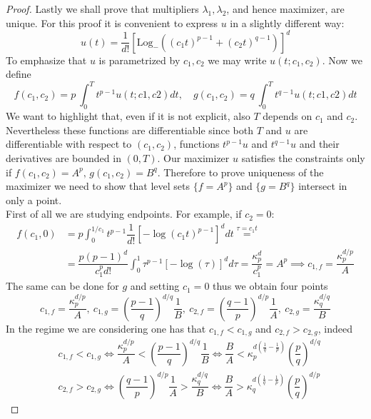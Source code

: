 \documentclass[corpo=11pt, stile=classica, tipotesi=custom,
greek, evenboxes, english]{toptesi}
\numberwithin{equation}{chapter}
\newcommand{\Log}{\ensuremath{\mathrm{Log}_-}}
\begin{document}
\begin{proof}
Lastly we shall prove that multipliers $\lambda_1, \lambda_2$, and hence maximizer, are unique. For this proof it is convenient to express $u$ in a slightly different way:
\begin{equation*}
	u(t) = \dfrac{1}{d!}\left[ \Log\left((c_1t)^{p-1} + (c_2t)^{q-1}\right) \right]^d
\end{equation*} 
To emphasize that $u$ is parametrized by $c_1, c_2$ we may write $u(t;c_1,c_2)$. Now we define
\begin{equation*}
	f(c_1,c_2) = p\ \int_0^T t^{p-1}u(t;c1,c2)dt, \quad g(c_1,c_2) = q\ \int_0^T t^{q-1}u(t;c1,c2)dt
\end{equation*}
We want to highlight that, even if it is not explicit, also $T$ depends on $c_1$ and $c_2$. Nevertheless these functions are differentiable since both $T$ and $u$ are differentiable with respect to $(c_1,c_2)$, functions $t^{p-1}u$ and $t^{q-1}u$ and their derivatives are bounded in $(0,T)$. 
Our maximizer $u$ satisfies the constraints only if $f(c_1,c_2)=A^p, \, g(c_1,c_2) = B^q$. Therefore to prove uniqueness of the maximizer we need to show that level sets $\{f=A^p\}$ and $\{g=B^q\}$ intersect in only a point.\\
First of all we are studying endpoints. For example, if $c_2=0$:
\begin{align*}
	f(c_1,0) &= p\int_0^{1/{c_1}} t^{p-1}\dfrac{1}{d!}\left[-\log(c_1t)^{p-1}\right]^d dt \overset{\tau = c_1t}{=} \\
			 &= \dfrac{p(p-1)^d}{c_1^p d!}\int_0^1 \tau^{p-1}\left[-\log(\tau)\right]^d d\tau = \dfrac{\kappa_p^d}{c_1^p} = A^p \implies c_{1,f} = \dfrac{\kappa_p^{d/p}}{A}
\end{align*}
The same can be done for $g$ and setting $c_1=0$ thus we obtain four points
\begin{equation*}
	c_{1,f} = \dfrac{\kappa_p^{d/p}}{A},\ c_{1,g} = \left(\dfrac{p-1}{q}\right)^{d/q}\dfrac1{B},\ c_{2,f} = \left(\dfrac{q-1}{p}\right)^{d/p}\dfrac1{A},\ c_{2,g} = \dfrac{\kappa_q^{d/q}}{B}
\end{equation*}
In the regime we are considering one has that $c_{1,f} < c_{1,g}$ and $c_{2,f} > c_{2,g}$, indeed
\begin{align*}
	&c_{1,f} < c_{1,g} \iff \dfrac{\kappa_p^{d/p}}{A} < \left(\dfrac{p-1}{q}\right)^{d/q}\dfrac1{B} \iff \dfrac{B}{A} < \kappa_p^{d\left( \frac1{q}-\frac1{p}\right)}\left(\dfrac{p}{q}\right)^{d/q}\\
	&c_{2,f} > c_{2,g} \iff \left(\dfrac{q-1}{p}\right)^{d/p}\dfrac1{A} > \dfrac{\kappa_q^{d/q}}{B} \iff \dfrac{B}{A} > \kappa_q^{d\left( \frac1{q}-\frac1{p}\right)}\left(\dfrac{p}{q}\right)^{d/p}

\end{align*}
\end{proof}
\end{document}
